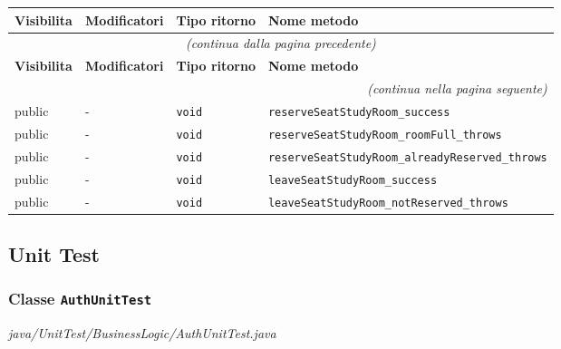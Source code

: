 \begin{longtable}{@{}llll@{}}
\toprule
\textbf{Visibilita} & \textbf{Modificatori} & \textbf{Tipo ritorno} & \textbf{Nome metodo} \\
\midrule
\endfirsthead
\multicolumn{4}{c}{\small\itshape (continua dalla pagina precedente)} \\
\toprule
\textbf{Visibilita} & \textbf{Modificatori} & \textbf{Tipo ritorno} & \textbf{Nome metodo} \\
\midrule
\endhead
\midrule
\multicolumn{4}{r}{\small\itshape (continua nella pagina seguente)} \\
\endfoot
\bottomrule
\endlastfoot
  public & - & \texttt{void} & \texttt{reserveSeatStudyRoom\_success} \\
  public & - & \texttt{void} & \texttt{reserveSeatStudyRoom\_roomFull\_throws} \\
  public & - & \texttt{void} & \texttt{reserveSeatStudyRoom\_alreadyReserved\_throws} \\
  public & - & \texttt{void} & \texttt{leaveSeatStudyRoom\_success} \\
  public & - & \texttt{void} & \texttt{leaveSeatStudyRoom\_notReserved\_throws} \\
\end{longtable}

\subsection*{Unit Test}\label{UnitTest}
\subsubsection*{Classe \texttt{AuthUnitTest}}\label{AuthUnitTest}
{\small\textit{java/UnitTest/BusinessLogic/AuthUnitTest.java}}
\vspace{4pt}

